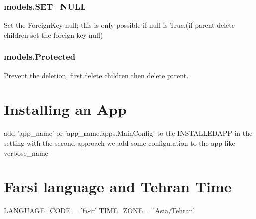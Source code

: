 \documentclass{article}
\begin{document}
			\subsubsection{models.SET\_NULL}
				Set the ForeignKey null; this is only possible if null is True.(if parent delete children set the foreign key null)
				
			\subsubsection{models.Protected}
				Prevent the deletion, first delete children then delete parent.
	
	\section{Installing an App}
		add 'app\_name' or 'app\_name.apps.MainConfig' to the INSTALLEDAPP in the setting with the second approach we add some configuration
		to the app like verbose\_name
	\section{Farsi language and Tehran Time}
		LANGUAGE\_CODE = 'fa-ir'  TIME\_ZONE = 'Asia/Tehran'
		
	
\end{document}

